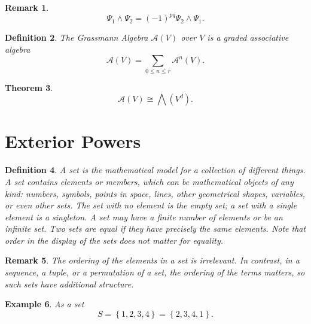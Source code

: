 \documentclass[aps,preprint]{revtex4}%
\newtheorem{theorem}{Theorem}
\newtheorem{definition}[theorem]{Definition}
\newtheorem{example}[theorem]{Example}
\newtheorem{remark}[theorem]{Remark}
\begin{document}
\begin{remark}%
\begin{equation}
\Psi_{1}\wedge\Psi_{2}=\left(  -1\right)  ^{pq}\Psi_{2}\wedge\Psi_{1}.
\end{equation}

\end{remark}

\begin{definition}
The Grassmann Algebra $\mathcal{A}\left(  V\right)  $ over $V$ is a graded
associative algebra
\begin{equation}
\mathcal{A}\left(  V\right)  =\sum_{0\leq n\leq r}\mathcal{A}^{n}\left(
V\right)  .
\end{equation}

\end{definition}

\begin{theorem}%
\begin{equation}
\mathcal{A}\left(  V\right)  \cong\bigwedge\left(  V^{d}\right)  .
\end{equation}

\end{theorem}

\section{Exterior Powers}

\begin{definition}
A \emph{set }is the mathematical model for a collection of different things. A
set contains \emph{elements} or \emph{members}, which can be mathematical
objects of any kind: numbers, symbols, points in space, lines, other
geometrical shapes, variables, or even other sets. The set with no element is
the empty set; a set with a single element is a singleton. A set may have a
finite number of elements or be an infinite set. Two sets are equal if they
have precisely the same elements. \emph{Note that order in the display of the
sets does not matter for equality.}
\end{definition}

\begin{remark}
The ordering of the elements in a set is irrelevant. \emph{In contrast,} in a
sequence, a tuple, or a permutation of a set, the ordering of the terms
matters, so such sets have additional structure.
\end{remark}

\begin{example}
As a set
\begin{equation}
S=\left\{  1,2,3,4\right\}  =\left\{  2,3,4,1\right\}  .
\end{equation}

\end{example}
\end{document}
